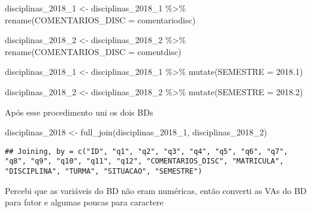 \documentclass[
]{article}
\newenvironment{Shaded}{\begin{snugshade}}{\end{snugshade}}
\newcommand{\AttributeTok}[1]{\textcolor[rgb]{0.77,0.63,0.00}{#1}}
\newcommand{\FloatTok}[1]{\textcolor[rgb]{0.00,0.00,0.81}{#1}}
\newcommand{\FunctionTok}[1]{\textcolor[rgb]{0.00,0.00,0.00}{#1}}
\newcommand{\NormalTok}[1]{#1}
\newcommand{\OtherTok}[1]{\textcolor[rgb]{0.56,0.35,0.01}{#1}}
\newcommand{\SpecialCharTok}[1]{\textcolor[rgb]{0.00,0.00,0.00}{#1}}
\begin{document}
\begin{Shaded}
\begin{Highlighting}[]
\NormalTok{disciplinas\_2018\_1 }\OtherTok{\textless{}{-}}\NormalTok{ disciplinas\_2018\_1 }\SpecialCharTok{\%\textgreater{}\%} 
  \FunctionTok{rename}\NormalTok{(}\AttributeTok{COMENTARIOS\_DISC =}\NormalTok{ comentariodisc)}

\NormalTok{disciplinas\_2018\_2 }\OtherTok{\textless{}{-}}\NormalTok{ disciplinas\_2018\_2 }\SpecialCharTok{\%\textgreater{}\%} 
  \FunctionTok{rename}\NormalTok{(}\AttributeTok{COMENTARIOS\_DISC =}\NormalTok{ comentdisc)}

\NormalTok{disciplinas\_2018\_1 }\OtherTok{\textless{}{-}}\NormalTok{ disciplinas\_2018\_1 }\SpecialCharTok{\%\textgreater{}\%} 
  \FunctionTok{mutate}\NormalTok{(}\AttributeTok{SEMESTRE =} \FloatTok{2018.1}\NormalTok{)}

\NormalTok{disciplinas\_2018\_2 }\OtherTok{\textless{}{-}}\NormalTok{ disciplinas\_2018\_2 }\SpecialCharTok{\%\textgreater{}\%} 
  \FunctionTok{mutate}\NormalTok{(}\AttributeTok{SEMESTRE =} \FloatTok{2018.2}\NormalTok{)}
\end{Highlighting}
\end{Shaded}

Após esse procedimento uni os dois BDs

\begin{Shaded}
\begin{Highlighting}[]
\NormalTok{disciplinas\_2018 }\OtherTok{\textless{}{-}} \FunctionTok{full\_join}\NormalTok{(disciplinas\_2018\_1, disciplinas\_2018\_2)}
\end{Highlighting}
\end{Shaded}

\begin{verbatim}
## Joining, by = c("ID", "q1", "q2", "q3", "q4", "q5", "q6", "q7", "q8", "q9", "q10", "q11", "q12", "COMENTARIOS_DISC", "MATRICULA", "DISCIPLINA", "TURMA", "SITUACAO", "SEMESTRE")
\end{verbatim}

Percebi que as variáveis do BD não eram numéricas, então converti as VAs
do BD para fator e algumas poucas para caractere
\end{document}
